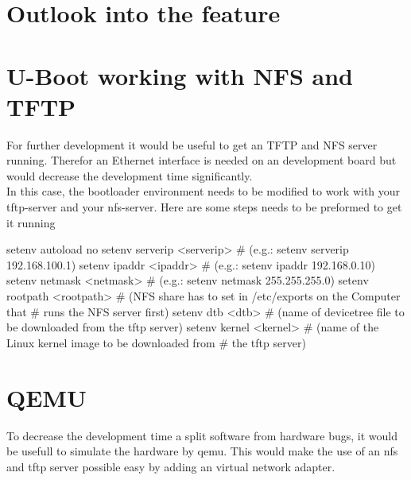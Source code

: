 
\chapter{Outlook into the feature}%
\label{cha:ausblick}


\chapter{U-Boot working with NFS and TFTP}%
\label{cha:U-Boot working with NFS and TFTP}

For further development it would be useful to get an TFTP and NFS server
running. Therefor an Ethernet interface is needed on an development board but
would decrease the development time significantly.
\\
In this case, the bootloader environment needs to be modified to work with your
tftp-server and your nfs-server. Here are some steps needs to be preformed to
get it running

\begin{listing}[language=bash]
    setenv autoload no
    setenv serverip <serverip>
        # (e.g.: setenv serverip 192.168.100.1)
    setenv ipaddr <ipaddr>
        # (e.g.: setenv ipaddr 192.168.0.10)
    setenv netmask <netmask>
        # (e.g.: setenv netmask 255.255.255.0)
    setenv rootpath <rootpath>
        # (NFS share has to set in /etc/exports on the Computer that
        # runs the NFS server first)
    setenv dtb <dtb>
        # (name of devicetree file to be downloaded from the tftp server)
    setenv kernel <kernel>
        # (name of the Linux kernel image to be downloaded from
        # the tftp server)
\end{listing}

\chapter{QEMU}%
\label{cha:QEMU}
To decrease the development time a split software from hardware bugs,
it would be usefull to simulate the hardware by qemu.
This would make the use of an nfs and tftp server possible easy by adding an
virtual network adapter.
